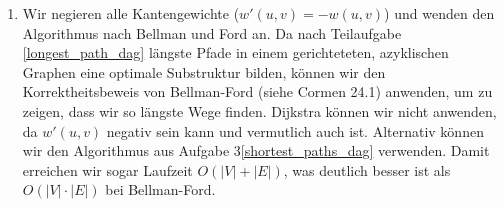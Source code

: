 \documentclass[11pt,a4paper]{article}
\begin{document}
\begin{loesung}
\begin{enumerate}
\begin{proof}
            Betrachten wir den Pfad $\hat{P} = (v_1, v_2, \ldots, v_i, v_1' \ldots, v_m', v_j, \ldots, v_{n - 1}, v_n)$.
            $\hat{P}$ muss zyklenfrei sein, da es sich um einen zusammenhängenden Pfad handelt und der Graph zyklenfrei ist.
            Es kann also kein Knoten doppelt vorkommen.
            Außerdem gilt:
            \begin{align*}
                w(P) = w(P_{1,i}) + w(P_{i, j}) + w(P(j, n))
                < w(P_{1,i}) + w(P') + w(P(j, n)) = w(\hat{P})
            \end{align*}
            Das Gewicht von $\hat{P}$ ist also größer als das von $P$.
            Das ist ein Widerspruch zur Annahme, dass $P$ ein längster Pfad ist.
        \end{proof}
        \item
        Wir negieren alle Kantengewichte ($w'(u, v) = -w(u, v)$) und wenden den Algorithmus nach Bellman und Ford an.
        Da nach Teilaufgabe \ref*{longest_path_dag} längste Pfade in einem gerichteteten, azyklischen Graphen eine optimale Substruktur bilden, können wir den Korrektheitsbeweis von Bellman-Ford (siehe Cormen 24.1) anwenden, um zu zeigen, dass wir so längste Wege finden.
        Dijkstra können wir nicht anwenden, da $w'(u, v)$ negativ sein kann und vermutlich auch ist.
        Alternativ können wir den Algorithmus aus Aufgabe 3\ref*{shortest_paths_dag} verwenden.
        Damit erreichen wir sogar Laufzeit $O(|V| + |E|)$, was deutlich besser ist als $O(|V| \cdot |E|)$ bei Bellman-Ford.
    \end{enumerate}
\end{loesung}
\end{document}
